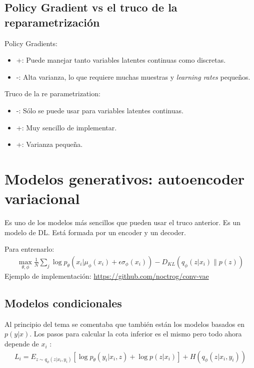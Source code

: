 \subsection{Policy Gradient vs el truco de la reparametrización}%
\label{sub:policy_gradient_vs_el_truco_de_la_reparametrización}

Policy Gradients:
\begin{itemize}
    \item +: Puede manejar tanto variables latentes continuas como discretas.
    \item -: Alta varianza, lo que requiere muchas muestras y \textit{learning
        rates} pequeños.
\end{itemize}
Truco de la re parametrization:
\begin{itemize}
    \item -: Sólo se puede usar para variables latentes continuas.
    \item +: Muy sencillo de implementar.
    \item +: Varianza pequeña.
\end{itemize}

\section{Modelos generativos: autoencoder variacional}%
\label{sec:modelos_generativos_autoencoder_variacional}

Es uno de los modelos más sencillos que pueden usar el truco anterior. Es un modelo de DL. Está
formada por un encoder y un decoder. 

Para entrenarlo:
\begin{align}
\operatorname { max } _ { \theta , \phi } \frac { 1 } { N } \sum _ { j } \operatorname { log } p _ { \theta } ( x _ { i } | \mu _ { \phi } ( x _ { i } ) + \epsilon \sigma _ { \phi } ( x _ { i } ) ) - D _ { KL } ( q _ { \phi } ( z | x _ { i } ) \| p ( z ) )
\end{align}
Ejemplo de implementación: \href{https://github.com/noctrog/conv-vae}{https://github.com/noctrog/conv-vae}

\subsection{Modelos condicionales}%
\label{sub:modelos_condicionales}

Al principio del tema se comentaba que también están los modelos basados en $p(y|x)$. Los pasos
para calcular la cota inferior es el mismo pero todo ahora depende de $x_i$ :
\begin{align}
L _ { i } = E _ { z \sim q _ { \phi } ( z | x _ { i } , y _ { i } ) } [ \operatorname { log } p _ { \theta } ( y _ { i } | x _ { i } , z ) + \operatorname { log } p ( z | x _ { i } ) ] + H ( q _ { \phi } ( z | x _ { i } , y _ { i } ) )
\end{align}

